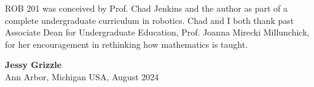 ROB 201 was conceived by Prof. Chad Jenkins and the author as part of a complete undergraduate curriculum in robotics. Chad and I both thank past Associate Dean for Undergraduate Education, Prof. Joanna Mirecki Millunchick, for her encouragement in rethinking how mathematics is taught. 

\textbf{Jessy Grizzle}\\
Ann Arbor, Michigan USA, August 2024

